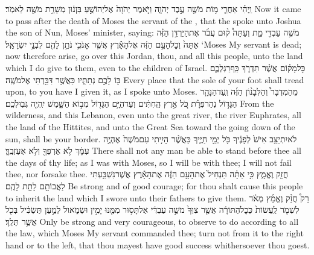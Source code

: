 \label{haft_54}
\setcounter{chap}{1}
\setcounter{verse}{1}
{וַֽיְהִ֗י אַחֲרֵ֛י מ֥וֹת מֹשֶׁ֖ה עֶ֣בֶד יְהֹוָ֑ה וַיֹּ֤אמֶר יְהֹוָה֙ אֶל\maqqaf יְהוֹשֻׁ֣עַ בִּן\maqqaf נ֔וּן מְשָׁרֵ֥ת מֹשֶׁ֖ה לֵאמֹֽר׃}
{Now it came to pass after the death of Moses the servant of the \lord, that the \lord\space spoke unto Joshua the son of Nun, Moses’ minister, saying:}
{מֹשֶׁ֥ה עַבְדִּ֖י מֵ֑ת וְעַתָּה֩ ק֨וּם עֲבֹ֜ר אֶת\maqqaf הַיַּרְדֵּ֣ן הַזֶּ֗ה אַתָּה֙ וְכׇל\maqqaf הָעָ֣ם הַזֶּ֔ה אֶל\maqqaf הָאָ֕רֶץ אֲשֶׁ֧ר אָנֹכִ֛י נֹתֵ֥ן לָהֶ֖ם לִבְנֵ֥י יִשְׂרָאֵֽל׃}
{‘Moses My servant is dead; now therefore arise, go over this Jordan, thou, and all this people, unto the land which I do give to them, even to the children of Israel.}
{כׇּל\maqqaf מָק֗וֹם אֲשֶׁ֨ר תִּדְרֹ֧ךְ כַּֽף\maqqaf רַגְלְכֶ֛ם בּ֖וֹ לָכֶ֣ם נְתַתִּ֑יו כַּאֲשֶׁ֥ר דִּבַּ֖רְתִּי אֶל\maqqaf מֹשֶֽׁה׃}
{Every place that the sole of your foot shall tread upon, to you have I given it, as I spoke unto Moses.}
{מֵהַמִּדְבָּר֩ וְהַלְּבָנ֨וֹן הַזֶּ֜ה וְֽעַד\maqqaf הַנָּהָ֧ר הַגָּד֣וֹל נְהַר\maqqaf פְּרָ֗ת כֹּ֚ל אֶ֣רֶץ הַֽחִתִּ֔ים וְעַד\maqqaf הַיָּ֥ם הַגָּד֖וֹל מְב֣וֹא הַשָּׁ֑מֶשׁ יִֽהְיֶ֖ה גְּבֽוּלְכֶֽם׃}
{From the wilderness, and this Lebanon, even unto the great river, the river Euphrates, all the land of the Hittites, and unto the Great Sea toward the going down of the sun, shall be your border.}
{לֹא\maqqaf יִתְיַצֵּ֥ב אִישׁ֙ לְפָנֶ֔יךָ כֹּ֖ל יְמֵ֣י חַיֶּ֑יךָ כַּאֲשֶׁ֨ר הָיִ֤יתִי עִם\maqqaf מֹשֶׁה֙ אֶהְיֶ֣ה עִמָּ֔ךְ לֹ֥א אַרְפְּךָ֖ וְלֹ֥א אֶעֶזְבֶֽךָּ׃}
{There shall not any man be able to stand before thee all the days of thy life; as I was with Moses, so I will be with thee; I will not fail thee, nor forsake thee.}
{חֲזַ֖ק וֶאֱמָ֑ץ כִּ֣י אַתָּ֗ה תַּנְחִיל֙ אֶת\maqqaf הָעָ֣ם הַזֶּ֔ה אֶת\maqqaf הָאָ֕רֶץ אֲשֶׁר\maqqaf נִשְׁבַּ֥עְתִּי לַאֲבוֹתָ֖ם לָתֵ֥ת לָהֶֽם׃}
{Be strong and of good courage; for thou shalt cause this people to inherit the land which I swore unto their fathers to give them.}
{רַק֩ חֲזַ֨ק וֶאֱמַ֜ץ מְאֹ֗ד לִשְׁמֹ֤ר לַֽעֲשׂוֹת֙ כְּכׇל\maqqaf הַתּוֹרָ֔ה אֲשֶׁ֤ר צִוְּךָ֙ מֹשֶׁ֣ה עַבְדִּ֔י אַל\maqqaf תָּס֥וּר מִמֶּ֖נּוּ יָמִ֣ין וּשְׂמֹ֑אול לְמַ֣עַן תַּשְׂכִּ֔יל בְּכֹ֖ל אֲשֶׁ֥ר תֵּלֵֽךְ׃}
{Only be strong and very courageous, to observe to do according to all the law, which Moses My servant commanded thee; turn not from it to the right hand or to the left, that thou mayest have good success whithersoever thou goest.}
